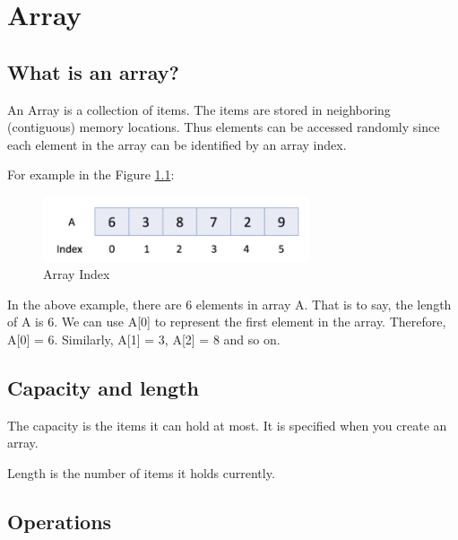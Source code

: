 
\chapter{Array}

\section{What is an array?}

An Array is a collection of items.
The items are stored in neighboring (contiguous) memory locations.
Thus elements can be accessed randomly since each element in the array can be identified by an array index.

For example in the Figure \ref{fig:array-index}:

\begin{figure}[!ht]
  \centering
  \includegraphics[width=0.7\textwidth]{pics/array-index}
  \caption{Array Index}
  \label{fig:array-index}
\end{figure}

In the above example, there are 6 elements in array A.
That is to say, the length of A is 6.
We can use A[0] to represent the first element in the array.
Therefore, A[0] = 6.
Similarly, A[1] = 3, A[2] = 8 and so on.





\section{Capacity and length}

The capacity is the items it can hold at most.
It is specified when you create an array.

Length is the number of items it holds currently.


\section{Operations}

